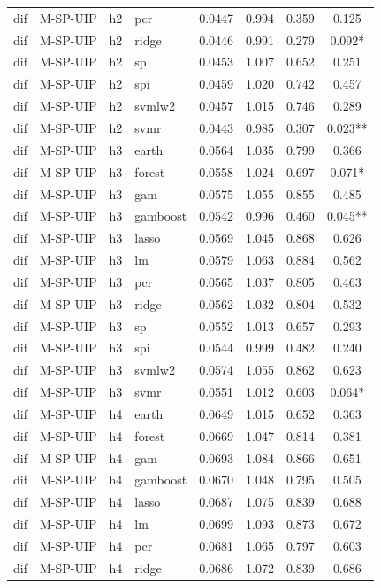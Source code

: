 \begin{ThreePartTable}
\begin{longtable}[t]{llclcccc}
dif & M-SP-UIP & h2 & pcr & 0.0447 & 0.994 & 0.359 & 0.125\\
dif & M-SP-UIP & h2 & ridge & 0.0446 & 0.991 & 0.279 & 0.092*\\
dif & M-SP-UIP & h2 & sp & 0.0453 & 1.007 & 0.652 & 0.251\\
dif & M-SP-UIP & h2 & spi & 0.0459 & 1.020 & 0.742 & 0.457\\
dif & M-SP-UIP & h2 & svmlw2 & 0.0457 & 1.015 & 0.746 & 0.289\\
dif & M-SP-UIP & h2 & svmr & 0.0443 & 0.985 & 0.307 & 0.023**\\
\addlinespace
dif & M-SP-UIP & h3 & earth & 0.0564 & 1.035 & 0.799 & 0.366\\
dif & M-SP-UIP & h3 & forest & 0.0558 & 1.024 & 0.697 & 0.071*\\
dif & M-SP-UIP & h3 & gam & 0.0575 & 1.055 & 0.855 & 0.485\\
dif & M-SP-UIP & h3 & gamboost & 0.0542 & 0.996 & 0.460 & 0.045**\\
dif & M-SP-UIP & h3 & lasso & 0.0569 & 1.045 & 0.868 & 0.626\\
dif & M-SP-UIP & h3 & lm & 0.0579 & 1.063 & 0.884 & 0.562\\
dif & M-SP-UIP & h3 & pcr & 0.0565 & 1.037 & 0.805 & 0.463\\
dif & M-SP-UIP & h3 & ridge & 0.0562 & 1.032 & 0.804 & 0.532\\
dif & M-SP-UIP & h3 & sp & 0.0552 & 1.013 & 0.657 & 0.293\\
dif & M-SP-UIP & h3 & spi & 0.0544 & 0.999 & 0.482 & 0.240\\
dif & M-SP-UIP & h3 & svmlw2 & 0.0574 & 1.055 & 0.862 & 0.623\\
dif & M-SP-UIP & h3 & svmr & 0.0551 & 1.012 & 0.603 & 0.064*\\
\addlinespace
dif & M-SP-UIP & h4 & earth & 0.0649 & 1.015 & 0.652 & 0.363\\
dif & M-SP-UIP & h4 & forest & 0.0669 & 1.047 & 0.814 & 0.381\\
dif & M-SP-UIP & h4 & gam & 0.0693 & 1.084 & 0.866 & 0.651\\
dif & M-SP-UIP & h4 & gamboost & 0.0670 & 1.048 & 0.795 & 0.505\\
dif & M-SP-UIP & h4 & lasso & 0.0687 & 1.075 & 0.839 & 0.688\\
dif & M-SP-UIP & h4 & lm & 0.0699 & 1.093 & 0.873 & 0.672\\
dif & M-SP-UIP & h4 & pcr & 0.0681 & 1.065 & 0.797 & 0.603\\
dif & M-SP-UIP & h4 & ridge & 0.0686 & 1.072 & 0.839 & 0.686\\

\end{longtable}
\end{ThreePartTable}
